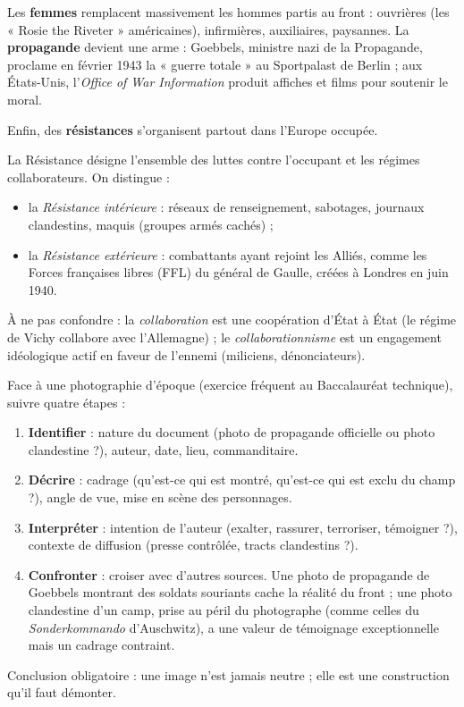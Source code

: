 \documentclass[11pt]{article}
\newcommand{\cle}[1]{{\popxbold\color{popdark}#1}}
\begin{document}
Les \textbf{femmes} remplacent massivement les hommes partis au front : ouvrières (les « Rosie the Riveter » américaines), infirmières, auxiliaires, paysannes. La \textbf{propagande} devient une arme : Goebbels, ministre nazi de la Propagande, proclame en février 1943 la « guerre totale » au Sportpalast de Berlin ; aux États-Unis, l'\emph{Office of War Information} produit affiches et films pour soutenir le moral.

Enfin, des \textbf{résistances} s'organisent partout dans l'Europe occupée.

\begin{definition}
La \cle{Résistance} désigne l'ensemble des luttes contre l'occupant et les régimes collaborateurs. On distingue :
\begin{itemize}
\item la \emph{Résistance intérieure} : réseaux de renseignement, sabotages, journaux clandestins, maquis (groupes armés cachés) ;
\item la \emph{Résistance extérieure} : combattants ayant rejoint les Alliés, comme les \cle{Forces françaises libres} (FFL) du général de Gaulle, créées à Londres en juin 1940.
\end{itemize}
À ne pas confondre : la \emph{collaboration} est une coopération d'État à État (le régime de Vichy collabore avec l'Allemagne) ; le \emph{collaborationnisme} est un engagement idéologique actif en faveur de l'ennemi (miliciens, dénonciateurs).
\end{definition}

\begin{methode}
Face à une photographie d'époque (exercice fréquent au Baccalauréat technique), suivre quatre étapes :
\begin{enumerate}
\item \textbf{Identifier} : nature du document (photo de propagande officielle ou photo clandestine ?), auteur, date, lieu, commanditaire.
\item \textbf{Décrire} : cadrage (qu'est-ce qui est montré, qu'est-ce qui est exclu du champ ?), angle de vue, mise en scène des personnages.
\item \textbf{Interpréter} : intention de l'auteur (exalter, rassurer, terroriser, témoigner ?), contexte de diffusion (presse contrôlée, tracts clandestins ?).
\item \textbf{Confronter} : croiser avec d'autres sources. Une photo de propagande de Goebbels montrant des soldats souriants cache la réalité du front ; une photo clandestine d'un camp, prise au péril du photographe (comme celles du \emph{Sonderkommando} d'Auschwitz), a une valeur de témoignage exceptionnelle mais un cadrage contraint.
\end{enumerate}
Conclusion obligatoire : une image n'est jamais neutre ; elle est une construction qu'il faut démonter.
\end{methode}
\end{document}
